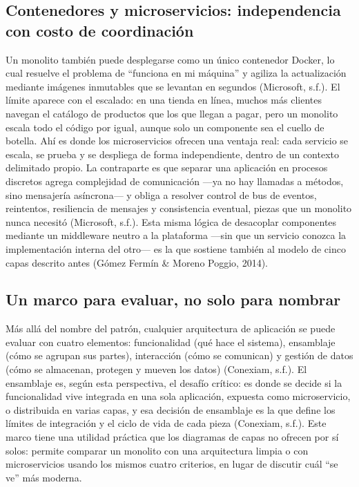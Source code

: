 \documentclass[
  spanish,
  12pt,
  letterpaper,
]{article}
\begin{document}
\subsection{Contenedores y microservicios: independencia con costo de
coordinación}\label{contenedores-y-microservicios-independencia-con-costo-de-coordinaciuxf3n}

Un monolito también puede desplegarse como un único contenedor Docker,
lo cual resuelve el problema de ``funciona en mi máquina'' y agiliza la
actualización mediante imágenes inmutables que se levantan en segundos
(Microsoft, s.f.). El límite aparece con el escalado: en una tienda en
línea, muchos más clientes navegan el catálogo de productos que los que
llegan a pagar, pero un monolito escala todo el código por igual, aunque
solo un componente sea el cuello de botella. Ahí es donde los
microservicios ofrecen una ventaja real: cada servicio se escala, se
prueba y se despliega de forma independiente, dentro de un contexto
delimitado propio. La contraparte es que separar una aplicación en
procesos discretos agrega complejidad de comunicación ---ya no hay
llamadas a métodos, sino mensajería asíncrona--- y obliga a resolver
control de bus de eventos, reintentos, resiliencia de mensajes y
consistencia eventual, piezas que un monolito nunca necesitó (Microsoft,
s.f.). Esta misma lógica de desacoplar componentes mediante un
middleware neutro a la plataforma ---sin que un servicio conozca la
implementación interna del otro--- es la que sostiene también al modelo
de cinco capas descrito antes (Gómez Fermín \& Moreno Poggio, 2014).

\subsection{Un marco para evaluar, no solo para
nombrar}\label{un-marco-para-evaluar-no-solo-para-nombrar}

Más allá del nombre del patrón, cualquier arquitectura de aplicación se
puede evaluar con cuatro elementos: funcionalidad (qué hace el sistema),
ensamblaje (cómo se agrupan sus partes), interacción (cómo se comunican)
y gestión de datos (cómo se almacenan, protegen y mueven los datos)
(Conexiam, s.f.). El ensamblaje es, según esta perspectiva, el desafío
crítico: es donde se decide si la funcionalidad vive integrada en una
sola aplicación, expuesta como microservicio, o distribuida en varias
capas, y esa decisión de ensamblaje es la que define los límites de
integración y el ciclo de vida de cada pieza (Conexiam, s.f.). Este
marco tiene una utilidad práctica que los diagramas de capas no ofrecen
por sí solos: permite comparar un monolito con una arquitectura limpia o
con microservicios usando los mismos cuatro criterios, en lugar de
discutir cuál ``se ve'' más moderna.
\end{document}
